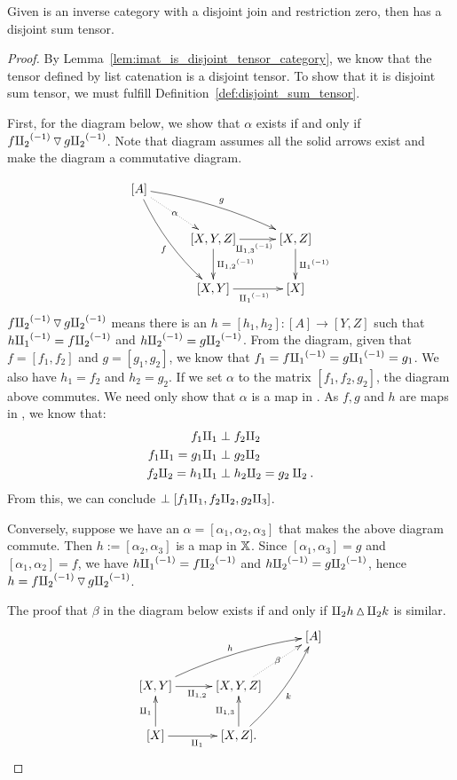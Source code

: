 \begin{lemma}\label{lem:imat_tensor_is_a_disjoint_sum_tensor}
  Given \X is an inverse category with a disjoint join and restriction zero, then \imatx
  has a disjoint sum tensor.
\end{lemma}
\begin{proof}
  By Lemma~\ref{lem:imat_is_disjoint_tensor_category}, we know that the tensor defined by
  list catenation is a disjoint tensor. To show that it is disjoint sum tensor, we must
  fulfill Definition~\ref{def:disjoint_sum_tensor}.

  First, for the diagram below, we show that $\alpha$ exists if and only if
  $f{\amalg_{2}}^{(-1)} \operatorname{\triangledown} g{\amalg_{2}}^{(-1)}$. Note that diagram assumes all the solid arrows exist and make the
  diagram a commutative diagram.

  \begin{align*}
    \xymatrix@C+5pt{
      [A] \ar@/_/[ddr]_f \ar@/^/[drr]^g \ar@{.>}[dr]|-{\alpha} \\
        & [X,Y,Z] \ar[d]^{\icp{1,2}} \ar[r]_{\icp{1,3}} & [X,Z] \ar[d]^{\icpa} \\
        & [X,Y] \ar[r]_{\icpa} & [X]
    }
  \end{align*}
  $f{\amalg_{2}}^{(-1)} \operatorname{\triangledown} g{\amalg_{2}}^{(-1)}$ means there is an $h = [h_1,h_2]: [A]\to[Y,Z]$ such that
  $h{\amalg_{1}}^{(-1)} = f{\amalg_{2}}^{(-1)}$ and $h{\amalg_{2}}^{(-1)} = g{\amalg_{2}}^{(-1)}$. From the diagram, given that $f = [f_1,f_2]$ and
  $g = [g_1,g_2]$, we know that $f_1 = f{\amalg_{1}}^{(-1)} = g{\amalg_{1}}^{(-1)} = g_1$. We also have $h_1 = f_2$ and
  $h_2 = g_2$. If we set $\alpha$ to the matrix $[f_1,f_2,g_2]$, the diagram above commutes.
  We need only show that $\alpha$ is a map in \imatx. As $f, g$ and $h$ are maps in
  \imatx, we know that:
  \begin{align*}
    f_1\amalg_{1} & \perp f_2 \amalg_{2}\\
    f_1\amalg_{1} = g_1\amalg_{1} & \perp g_2 \amalg_{2}\\
    f_2 \amalg_{2} = h_1\amalg_{1} & \perp h_2 \amalg_{2} = g_2 \amalg_{2}.\\
  \end{align*}
  From this, we can conclude $\perp [f_1 \amalg_{1}, f_2 \amalg_{2}, g_2 \amalg_{3}]$.

  Conversely, suppose we have an $\alpha = [\alpha_1, \alpha_2, \alpha_3]$ that makes the
  above diagram commute. Then  $h := [\alpha_2, \alpha_3]$ is a map in $\mathbb{X}$.
  Since $[\alpha_1,\alpha_3] = g$ and $[\alpha_1,\alpha_2] = f$, we have
  $h{\amalg_{1}}^{(-1)} = f{\amalg_{2}}^{(-1)}$ and $h{\amalg_{2}}^{(-1)} = g{\amalg_{2}}^{(-1)}$, hence $h = f{\amalg_{2}}^{(-1)} \operatorname{\triangledown} g{\amalg_{2}}^{(-1)}$.

  The proof that $\beta$ in the diagram below exists if and only if $\amalg_{2}h\operatorname{\vartriangle} \amalg_{2}k$
  is similar.
  \[
    \xymatrix@C+5pt{
        &&[A] \\
         [X,Y] \ar[r]_{\cp{1,2}} \ar@/^/[urr]^h &[X,Y,Z] \ar@{.>}[ur]|-{\beta} \\
         [X] \ar[u]^{\cpa} \ar[r]_{\cpa} & [X,Z]. \ar[u]^{\cp{1,3}} \ar@/_/[uur]_k
    }
  \]
\end{proof}

